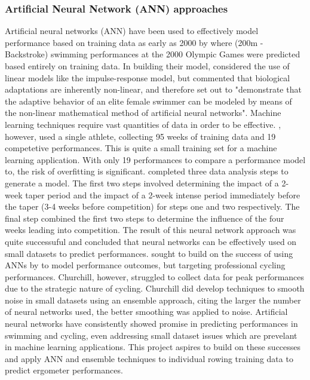 \subsubsection{Artificial Neural Network (ANN) approaches}
Artificial neural networks (ANN) have been used to effectively model performance based on training data as early as 2000 by \textcite{Edelmannnusser2002} where (200m - Backstroke) swimming performances at the 2000 Olympic Games were predicted based entirely on training data. In building their model, \textcite{Edelmannnusser2002} considered the use of linear models like the impulse-response model, but commented that biological adaptations are inherently non-linear, and therefore set out to "demonstrate that the adaptive behavior of an elite female swimmer can be modeled by means of the non-linear mathematical method of artificial neural networks". Machine learning techniques require vast quantities of data in order to be effective. \textcite{Edelmannnusser2002}, however, used a single athlete, collecting 95 weeks of training data and 19 competetive performances. This is quite a small training set for a machine learning application. With only 19 performances to compare a performance model to, the risk of overfitting is significant. \textcite{Edelmannnusser2002} completed three data analysis steps to generate a model. The first two steps involved determining the impact of a 2-week taper period and the impact of a 2-week intense period immediately before the taper (3-4 weeks before competition) for steps one and two respectively. The final step combined the first two steps to determine the influence of the four weeks leading into competition. The result of this neural network approach was quite successuful and \textcite{Edelmannnusser2002} concluded that neural networks can be effectively used on small datasets to predict performances. \textcite{Churchill2014} sought to build on the success of using ANNs by \textcite{Edelmannnusser2002} to model performance outcomes, but targeting professional cycling performances. Churchill, however, struggled to collect data for peak performances due to the strategic nature of cycling. Churchill did develop techniques to smooth noise in small datasets using an ensemble approach, citing the larger the number of neural networks used, the better smoothing was applied to noise. Artificial neural networks have consistently showed promise in predicting performances in swimming and cycling, even addressing small dataset issues which are prevelant in machine learning applications. This project aspires to build on these successes and apply ANN and ensemble techniques to individual rowing training data to predict ergometer performances.
